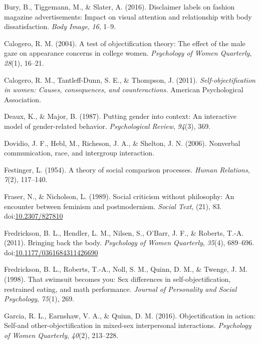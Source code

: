 \documentclass[man]{apa6}
\begin{document}
\hypertarget{ref-bury2016}{}
Bury, B., Tiggemann, M., \& Slater, A. (2016). Disclaimer labels on
fashion magazine advertisements: Impact on visual attention and
relationship with body dissatisfaction. \emph{Body Image}, \emph{16},
1--9.

\hypertarget{ref-calogero2004test}{}
Calogero, R. M. (2004). A test of objectification theory: The effect of
the male gaze on appearance concerns in college women. \emph{Psychology
of Women Quarterly}, \emph{28}(1), 16--21.

\hypertarget{ref-calogero2011}{}
Calogero, R. M., Tantleff-Dunn, S. E., \& Thompson, J. (2011).
\emph{Self-objectification in women: Causes, consequences, and
counteractions.} American Psychological Association.

\hypertarget{ref-deaux1987putting}{}
Deaux, K., \& Major, B. (1987). Putting gender into context: An
interactive model of gender-related behavior. \emph{Psychological
Review}, \emph{94}(3), 369.

\hypertarget{ref-dovidio2006nonverbal}{}
Dovidio, J. F., Hebl, M., Richeson, J. A., \& Shelton, J. N. (2006).
Nonverbal communication, race, and intergroup interaction.

\hypertarget{ref-festinger1954theory}{}
Festinger, L. (1954). A theory of social comparison processes.
\emph{Human Relations}, \emph{7}(2), 117--140.

\hypertarget{ref-frasernicholson1989}{}
Fraser, N., \& Nicholson, L. (1989). Social criticism without
philosophy: An encounter between feminism and postmodernism.
\emph{Social Text}, (21), 83.
doi:\href{https://doi.org/10.2307/827810}{10.2307/827810}

\hypertarget{ref-fredricksonetal2011}{}
Fredrickson, B. L., Hendler, L. M., Nilsen, S., O'Barr, J. F., \&
Roberts, T.-A. (2011). Bringing back the body. \emph{Psychology of Women
Quarterly}, \emph{35}(4), 689--696.
doi:\href{https://doi.org/10.1177/0361684311426690}{10.1177/0361684311426690}

\hypertarget{ref-fredrickson1998swimsuit}{}
Fredrickson, B. L., Roberts, T.-A., Noll, S. M., Quinn, D. M., \&
Twenge, J. M. (1998). That swimsuit becomes you: Sex differences in
self-objectification, restrained eating, and math performance.
\emph{Journal of Personality and Social Psychology}, \emph{75}(1), 269.

\hypertarget{ref-garcia2016objectification}{}
Garcia, R. L., Earnshaw, V. A., \& Quinn, D. M. (2016). Objectification
in action: Self-and other-objectification in mixed-sex interpersonal
interactions. \emph{Psychology of Women Quarterly}, \emph{40}(2),
213--228.
\end{document}
